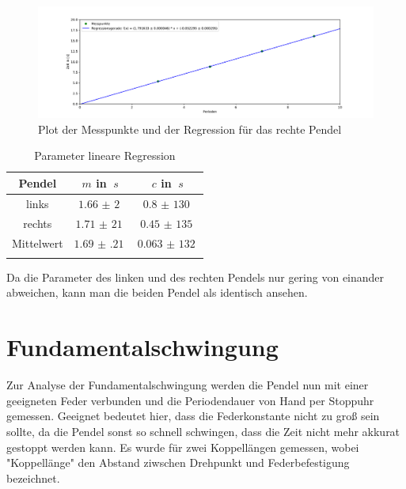 \begin{figure}[h!]
    \centering
    \includegraphics[scale=0.4]{./Pendel/Protokoll/fig/Koppelpendel_Regression_2.pdf}
    \caption{Plot der Messpunkte und der Regression für das rechte Pendel}
    \label{fig:Reg_rechts}
\end{figure}

\begin{table}[h!]
    \begin{center}
        \caption{Parameter lineare Regression}
        \begin{tabular}{ccc}
            \hline
            Pendel             & $m$ in $\SI{}{s}$ & $c$ in $\SI{}{s}$ \\
            \hline
            links              & $\SI{1,66(2)}{}$ & $\SI{0,8(130)}{}$ \\
            rechts             & $\SI{1,71(21)}{}$ & $\SI{0,45(135)}{}$  \\
            \hline
            Mittelwert         & $\SI{1.69(21)}{}$ & $\SI{0,063(132)}{}$ \\
            \hline
            \label{tab:Schwingungen-einzeln-Regression}
        \end{tabular}
    \end{center}
\end{table}


Da die Parameter des linken und des rechten Pendels nur gering von einander abweichen, kann man die beiden Pendel als identisch ansehen.


\clearpage

\section{Fundamentalschwingung}

Zur Analyse der Fundamentalschwingung werden die Pendel nun mit einer geeigneten Feder verbunden und die Periodendauer von Hand per Stoppuhr gemessen.
Geeignet bedeutet hier, dass die Federkonstante nicht zu groß sein sollte, da die Pendel sonst so schnell schwingen, dass die Zeit nicht mehr akkurat gestoppt werden kann.
Es wurde für zwei Koppellängen gemessen, wobei "Koppellänge" den Abstand ziwschen Drehpunkt und Federbefestigung bezeichnet.

